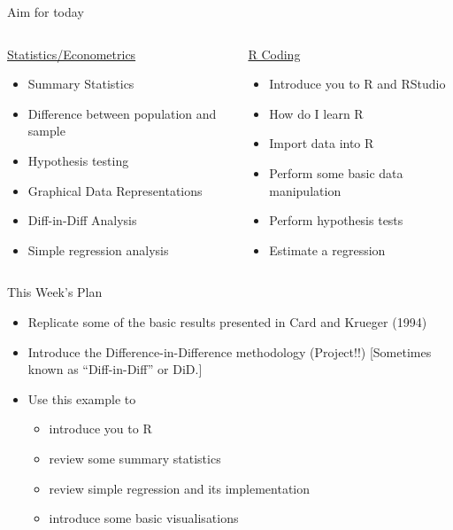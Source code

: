 \documentclass[
  ignorenonframetext,
]{beamer}
\begin{document}
\begin{frame}{Aim for today}
\protect\hypertarget{aim-for-today}{}
\begin{columns}
  
  \begin{column}{0.5\textwidth}
    \underline{Statistics/Econometrics}
    \begin{itemize}
      \item Summary Statistics
      \item Difference between population and sample
      \item Hypothesis testing
      \item Graphical Data Representations
      \item Diff-in-Diff Analysis
      \item Simple regression analysis
    \end{itemize}
  \end{column}
  \begin{column}{0.5\textwidth}
    \underline{R Coding}
    \begin{itemize}
      \item Introduce you to R and RStudio
      \item How do I learn R
      \item Import data into R
      \item Perform some basic data manipulation
      \item Perform hypothesis tests
      \item Estimate a regression
    \end{itemize}
  \end{column}
    
\end{columns}
\end{frame}

\begin{frame}{This Week's Plan}
\protect\hypertarget{this-weeks-plan}{}
\begin{itemize}
  \item Replicate some of the basic results presented in Card and Krueger (1994)
  \item Introduce the Difference-in-Difference methodology (Project!!) [Sometimes known as “Diff-in-Diff” or DiD.]
  \item Use this example to 
    \begin{itemize}
      \item introduce you to R
      \item review some summary statistics
      \item review simple regression and its implementation
      \item introduce some basic visualisations
    \end{itemize}
\end{itemize}
\end{frame}
\end{document}
